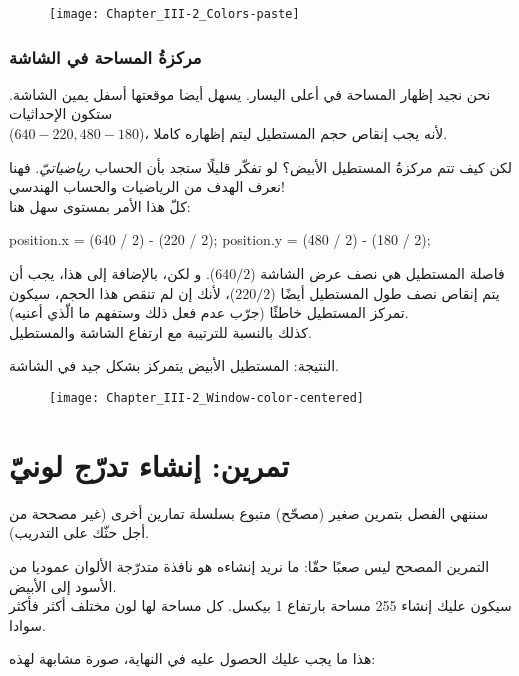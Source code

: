\begin{figure}[H]
	\centering
	\texttt{[image: Chapter\_III-2\_Colors-paste]}
\end{figure}

\subsubsection{مركزةُ المساحة في الشاشة}

نحن نجيد إظهار المساحة في أعلى اليسار. يسهل أيضا موقعتها أسفل يمين الشاشة. ستكون الإحداثيات\\
\mbox{($640 - 220, 480 - 180$)}،
لأنه يجب إنقاص حجم المستطيل ليتم إظهاره كاملا. 

لكن كيف تتم مركزةُ المستطيل الأبيض؟ لو تفكّر قليلًا ستجد بأن الحساب
\textit{رياضياتيّ}.
فهنا نعرف الهدف من الرياضيات والحساب الهندسي!\\
كلّ هذا الأمر بمستوى سهل هنا:

\begin{Csource}
position.x = (640 / 2) - (220 / 2);
position.y = (480 / 2) - (180 / 2);
\end{Csource}

فاصلة المستطيل هي نصف عرض الشاشة
($640 / 2$).
و لكن، بالإضافة إلى هذا، يجب أن يتم إنقاص نصف طول المستطيل أيضًا 
($220 / 2$)،
لأنك إن لم تنقص هذا الحجم، سيكون تمركز المستطيل خاطئًا (جرّب عدم فعل ذلك وستفهم ما الّذي أعنيه).\\
كذلك بالنسبة للترتيبة مع ارتفاع الشاشة والمستطيل.

النتيجة: المستطيل الأبيض يتمركز بشكل جيد في الشاشة.

\begin{figure}[H]
	\centering
	\texttt{[image: Chapter\_III-2\_Window-color-centered]}
\end{figure}

\section{تمرين: إنشاء تدرّج لونيّ}

سننهي الفصل بتمرين صغير (مصحّح) متبوع بسلسلة تمارين أخرى (غير مصححة من أجل حثّك على التدريب).

التمرين المصحح ليس صعبًا حقّا: ما نريد إنشاءه هو نافذة متدرّجة الألوان عموديا من الأسود إلى الأبيض.\\
سيكون عليك إنشاء 255 مساحة بارتفاع 1 بيكسل. كل مساحة لها لون مختلف أكثر فأكثر سوادا.

هذا ما يجب عليك الحصول عليه في النهاية، صورة مشابهة لهذه:

